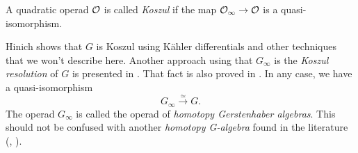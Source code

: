 \documentclass[TFM.tex]{subfiles}
\begin{document}
\begin{defi}
A quadratic operad ${\mathcal O}$ is called \emph{Koszul} if the map ${\mathcal O}_\infty\to {\mathcal O}$ is a quasi-isomorphism.
\end{defi}

Hinich \cite{Hinich} shows that $G$ is Koszul using Kähler differentials and other techniques that we won't describe here. Another approach using that $G_\infty$ is the \emph{Koszul resolution} of $G$ is presented in \cite{AlgebraicOperads}. That fact is also proved in \cite{GJHinich}. In any case, we have a  quasi-isomorphism
\begin{equation*}
G_\infty\xrightarrow{\simeq} G.
\end{equation*}
The operad $G_\infty$ is called the operad of \emph{homotopy Gerstenhaber algebras}. This should not be confused with another \emph{homotopy G-algebra} found in the literature (\cite{VO}, \cite{VGH}). 


%






\end{document}

